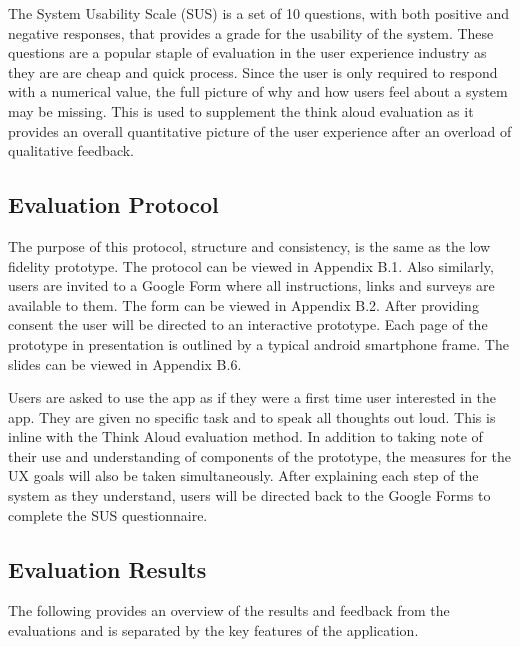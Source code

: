 \documentclass[a4 paper, 12pt]{article}
\begin{document}
The System Usability Scale (SUS) is a set of 10 questions, with both positive and negative responses, that provides a grade for the usability of the system. These questions are a popular staple of evaluation in the user experience industry as they are are cheap and quick process. Since the user is only required to respond with a numerical value, the full picture of why and how users feel about a system may be missing. This is used to supplement the think aloud evaluation as it provides an overall quantitative picture of the user experience after an overload of qualitative feedback.


\subsection{Evaluation Protocol}
The purpose of this protocol, structure and consistency, is the same as the low fidelity prototype. The protocol can be viewed in Appendix B.1. Also similarly, users are invited to a Google Form where all instructions, links and surveys are available to them. The form can be viewed in Appendix B.2. After providing consent the user will be directed to an interactive prototype. Each page of the prototype in presentation is outlined by a typical android smartphone frame. The slides can be viewed in Appendix B.6. 

Users are asked to use the app as if they were a first time user interested in the app. They are given no specific task and to speak all thoughts out loud. This is inline with the Think Aloud evaluation method. In addition to taking note of their use and understanding of components of the prototype, the measures for the UX goals will also be taken simultaneously. After explaining each step of the system as they understand, users will be directed back to the Google Forms to complete the SUS questionnaire. 

\subsection{Evaluation Results}
The following provides an overview of the results and feedback from the evaluations and is separated by the key features of the application.
\end{document}
